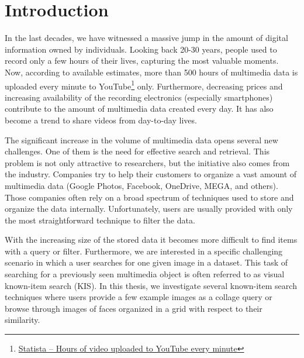 \chapter*{Introduction}

In the last decades, we have witnessed a massive jump in the amount of digital information owned by individuals. Looking back 20-30 years, people used to record only a few hours of their lives, capturing the most valuable  moments. Now, according to available estimates, more than 500 hours of multimedia data is uploaded every minute  to YouTube\footnote{\href{https://www.statista.com/statistics/259477/hours-of-video-uploaded-to-youtube-every-minute/}{Statista -- Hours of video uploaded to YouTube every minute}} only. Furthermore, decreasing prices and increasing availability of the recording electronics (especially smartphones) contribute to the amount of multimedia  data created every day. It has also become a trend to share videos from day-to-day lives.

The significant increase in the volume of multimedia data opens several new challenges. One of them is the need for effective search and retrieval. This problem is not only attractive to researchers, but the initiative also comes from the industry. Companies try to help their customers to organize a vast amount  of multimedia data (Google Photos, Facebook, OneDrive, MEGA, and others). Those companies often rely on a broad spectrum of techniques used to store and organize the data internally. Unfortunately, users are usually provided with only the most straightforward technique to filter the data.

 With the increasing size of the stored data it becomes more difficult to find items with a query or filter.
 Furthermore, we are interested in a specific challenging scenario in which a user searches for one given image in a dataset. This task of searching for a previously seen multimedia object is often referred to as visual known-item search (KIS). In this thesis, we investigate several known-item search techniques where users provide a few example images as a collage query or browse through images of faces organized in a grid with respect to their similarity.

